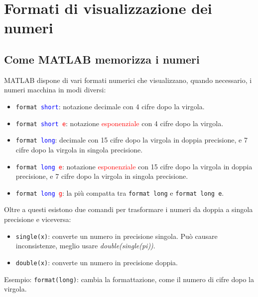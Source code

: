 \chapter{Formati di visualizzazione dei numeri}
\section{Come MATLAB memorizza i numeri}
MATLAB dispone di vari formati numerici che visualizzano, quando necessario, i numeri macchina in modi diversi:
\begin{itemize}

	\item	\texttt{format \textcolor{blue}{short}}: notazione decimale con 4 cifre dopo la virgola.
	
	\item	\texttt{format \textcolor{blue}{short} \textcolor{red}{e}}: notazione \textcolor{red}{esponenziale} 
			con 4 cifre dopo la virgola.
			
	\item	\texttt{format \textcolor{blue}{long}}: decimale con 15 cifre dopo la virgola in doppia precisione, e 
			7 cifre dopo la virgola in singola precisione.
			
	\item	\texttt{format \textcolor{blue}{long} \textcolor{red}{e}}: notazione \textcolor{red}{esponenziale} 
			con 15 cifre dopo la virgola in doppia precisione, e 7 cifre dopo la virgola in singola precisione.
			
	\item	\texttt{format \textcolor{blue}{long} \textcolor{red}{g}}: la più compatta tra \texttt{format long} e 
			\texttt{format long e}.

\end{itemize}

Oltre a questi esistono due comandi per trasformare i numeri da doppia a singola precisione e viceversa:
\begin{itemize}

	\item	\texttt{single(x)}: converte un numero in precisione singola. Può causare inconsistenze, meglio usare 
	\textit{double(single(pi))}.
	
	\item 	\texttt{double(x)}: converte un numero in precisione doppia.
\end{itemize}

Esempio: \texttt{format(long)}: cambia la formattazione, come il numero di cifre dopo la virgola.
